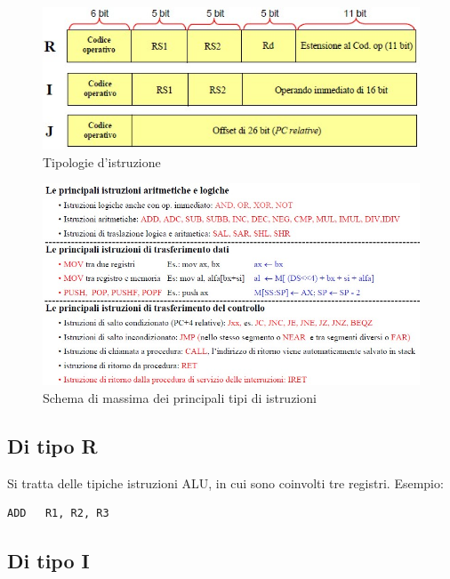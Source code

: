 \begin{figure}[!h]
\centering
\includegraphics[width=0.65\columnwidth]{img/TipiIstruzioni}
\caption{Tipologie d'istruzione}
\label{fig:TipiIstruzioni}
\end{figure}
\begin{figure}[!h]
\centering
\includegraphics[width=\columnwidth]{img/listaistruzioni}
\caption{Schema di massima dei principali tipi di istruzioni}
\label{fig:listaistruzioni}
\end{figure}

\subsection{Di tipo R}
\label{sec:tipoR}

Si tratta delle tipiche istruzioni ALU, in cui sono coinvolti tre registri. Esempio:
\begin{verbatim}
ADD   R1, R2, R3
\end{verbatim}

\subsection{Di tipo I}
\label{sec:tipoI}

